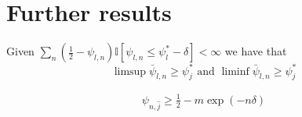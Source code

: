 \section{Further results}

\begin{lemma}\label{lemma:limsup_undersampling}
  Given $\sum_n(\frac{1}{2} - \psi_{l, n}) \mathbb{I}[\psi_{l, n} \leq \psi_l^* - \delta] < \infty$ we have that
  \[\limsup \bar{\psi}_{l, n} \geq \psi_j^* \text{ and } \liminf \bar{\psi}_{l, n} \geq \psi_j^*\]
\end{lemma}

\begin{lemma}\label{lemma:psi_undersampled}
  \begin{align}
    \psi_{n, \hat{j}} \geq \frac{1}{2} - m\exp(-n \delta)
  \end{align}
\end{lemma}

